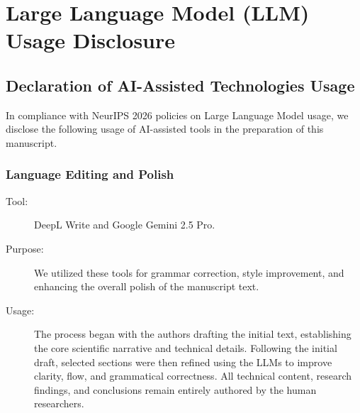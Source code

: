 
\section{Large Language Model (LLM) Usage Disclosure}
\label{app:llm}

\subsection{Declaration of AI-Assisted Technologies Usage}
\label{app:llm:declaration}
In compliance with NeurIPS 2026 policies on Large Language Model usage, we disclose the following usage of AI-assisted tools in the preparation of this manuscript.

\subsubsection{Language Editing and Polish}
\label{app:llm:writing}
\begin{description}
	\item[Tool:] DeepL Write and Google Gemini 2.5 Pro.
	\item[Purpose:] We utilized these tools for grammar correction, style improvement, and enhancing the overall polish of the manuscript text.
	\item[Usage:] The process began with the authors drafting the initial text, establishing the core scientific narrative and technical details.
	Following the initial draft, selected sections were then refined using the LLMs to improve clarity, flow, and grammatical correctness.
	All technical content, research findings, and conclusions remain entirely authored by the human researchers.
\end{description}

